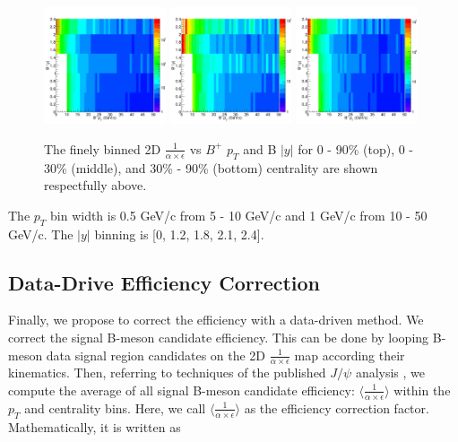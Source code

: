 \begin{figure}[h]
\begin{center}
\includegraphics[width= 0.32\textwidth]{Figures/Chapter4/BPEff2D_0_90.png}
\includegraphics[width= 0.32\textwidth]{Figures/Chapter4/BPEff2D_0_30.png}
\includegraphics[width= 0.32\textwidth]{Figures/Chapter4/BPEff2D_30_90.png}
\caption{The finely binned 2D $\frac{1}{\alpha \times \epsilon}$ vs $B^+$ $p_T$ and B $|y|$ for 0 - 90\% (top), 0 - 30\% (middle), and 30\% - 90\% (bottom) centrality are shown respectfully above.}
\label{BP2DMap}
\end{center}
\end{figure}

The $p_T$ bin width is 0.5 GeV/c from 5 - 10 GeV/c and 1 GeV/c from 10 - 50 GeV/c. The $|y|$ binning is [0, 1.2, 1.8, 2.1, 2.4].

\subsection{Data-Drive Efficiency Correction}

Finally, we propose to correct the efficiency with a data-driven method. We correct the signal B-meson candidate efficiency. This can be done by looping B-meson data signal region candidates on the 2D $\frac{1}{\alpha \times \epsilon}$ map according their kinematics. Then, referring to techniques of the published $J/\psi$ analysis \cite{DataAve}, we compute the average of all signal B-meson candidate efficiency: $\langle\frac{1}{\alpha \times \epsilon} \rangle$ within the $p_T$ and centrality bins. Here, we call $\langle\frac{1}{\alpha \times \epsilon} \rangle$ as the efficiency correction factor. Mathematically, it is written as

